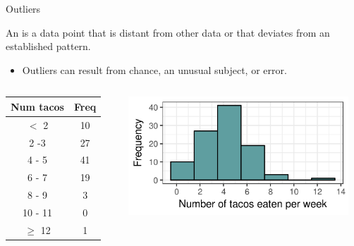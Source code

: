 \documentclass[xcolor=table, aspectratio=169, bigger, handout]{beamer}
\begin{document}
\begin{frame}{Outliers}
\begin{block}{}
An  is a data point that is distant from other data or that deviates from an established pattern.

\begin{itemize}
\item Outliers can result from chance, an unusual subject, or error.
\end{itemize}
\end{block}

\pause

\begin{columns}
\begin{column}{0.35\textwidth}
\begin{exampleblock}{}
\begin{center}
\begin{tabular}{cc}
Num tacos & Freq \\
\hline
 $<$ 2 & 10 \\
2 -3 & 27 \\
4 - 5 & 41 \\
6 - 7 & 19 \\
8 - 9 & 3 \\
10 - 11 & 0 \\
$\ge$ 12 & 1 \\
\end{tabular}
\end{center}
\end{exampleblock}
\end{column}

\begin{column}{0.65\textwidth}
\begin{center}
\includegraphics[width=3.25in]{../images/wk04_taco_out_hist}

\end{center}
\end{column}
\end{columns}
\end{frame}
\end{document}
